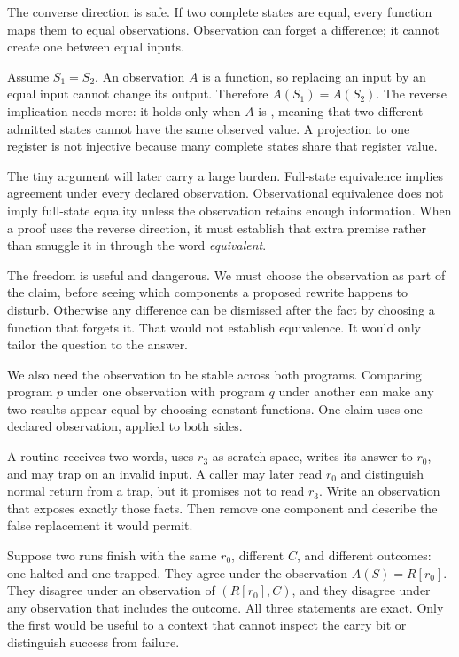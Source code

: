 The converse direction is safe. If two complete states are equal, every
function maps them to equal observations. Observation can forget a
difference; it cannot create one between equal inputs.

\begin{proofkit}[title={\iconProofKit\ Equality survives every observation}]
Assume \(S_1=S_2\). An observation \(A\) is a function, so replacing an input
by an equal input cannot change its output. Therefore \(A(S_1)=A(S_2)\).
The reverse implication needs more: it holds only when \(A\) is
, meaning that two different admitted states cannot have
the same observed value. A projection to one register is not injective
because many complete states share that register value.
\end{proofkit}

The tiny argument will later carry a large burden. Full-state equivalence
implies agreement under every declared observation. Observational equivalence
does not imply full-state equality unless the observation retains enough
information. When a proof uses the reverse direction, it must establish that
extra premise rather than smuggle it in through the word \emph{equivalent}.

The freedom is useful and dangerous. We must choose the observation as part
of the claim, before seeing which components a proposed rewrite happens to
disturb. Otherwise any difference can be dismissed after the fact by choosing
a function that forgets it. That would not establish equivalence. It would
only tailor the question to the answer.

We also need the observation to be stable across both programs. Comparing
program \(p\) under one observation with program \(q\) under another can make
any two results appear equal by choosing constant functions. One claim uses
one declared observation, applied to both sides.

\begin{tryit}[title={Design the smallest honest observation}]
A routine receives two words, uses \(r_3\) as scratch space, writes its answer
to \(r_0\), and may trap on an invalid input. A caller may later read \(r_0\)
and distinguish normal return from a trap, but it promises not to read
\(r_3\). Write an observation that exposes exactly those facts. Then remove
one component and describe the false replacement it would permit.
\end{tryit}

\begin{example}[title={One result, three questions}]
Suppose two runs finish with the same \(r_0\), different \(C\), and different
outcomes: one halted and one trapped. They agree under the observation
\(A(S)=R[r_0]\). They disagree under an observation of \((R[r_0],C)\), and
they disagree under any observation that includes the outcome. All three
statements are exact. Only the first would be useful to a context that cannot
inspect the carry bit or distinguish success from failure.
\end{example}

